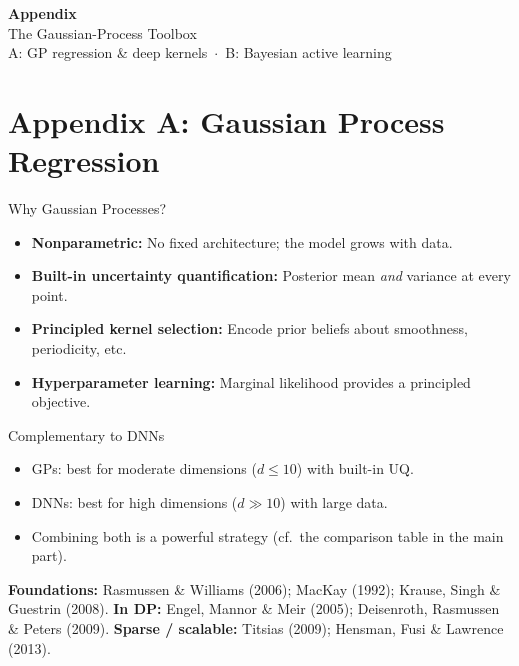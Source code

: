 \documentclass[aspectratio=169,11pt]{beamer}
\begin{document}
\appendix

{
\begin{frame}[plain,c]
\begin{center}
{\Huge\bfseries Appendix}\\[0.4cm]
{\LARGE The Gaussian-Process Toolbox}\\[0.6cm]
{\normalsize A: GP regression \& deep kernels \,$\cdot$\, B: Bayesian active learning}
\end{center}
\end{frame}
}

\section{Appendix A: Gaussian Process Regression}

\begin{frame}{Why Gaussian Processes?}
\begin{itemize}
  \item \textbf{Nonparametric:} No fixed architecture; the model grows with data.
  \item \textbf{Built-in uncertainty quantification:} Posterior mean \emph{and} variance at every point.
  \item \textbf{Principled kernel selection:} Encode prior beliefs about smoothness, periodicity, etc.
  \item \textbf{Hyperparameter learning:} Marginal likelihood provides a principled objective.
\end{itemize}

\vspace{0.3cm}
\begin{alertblock}{Complementary to DNNs}
\begin{itemize}
  \item GPs: best for moderate dimensions ($d \leq 10$) with built-in UQ.
  \item DNNs: best for high dimensions ($d \gg 10$) with large data.
  \item Combining both is a powerful strategy (cf.\ the comparison table in the main part).
\end{itemize}
\end{alertblock}

\vspace{0.15cm}
{\tiny \textbf{Foundations:} Rasmussen \& Williams (2006); MacKay (1992); Krause, Singh \& Guestrin (2008).
\textbf{In DP:} Engel, Mannor \& Meir (2005); Deisenroth, Rasmussen \& Peters (2009).
\textbf{Sparse / scalable:} Titsias (2009); Hensman, Fusi \& Lawrence (2013).}
\end{frame}
\end{document}
